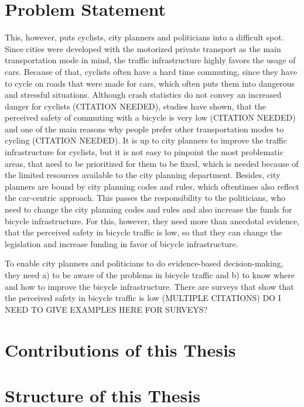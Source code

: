 \section{Problem Statement}
\label{sec:problem}
This, however, puts cyclists, city planners and politicians into a difficult spot.
Since cities were developed with the motorized private transport as the main transportation mode in mind, the traffic infrastructure highly favors the usage of cars.
Because of that, cyclists often have a hard time commuting, since they have to cycle on roads that were made for cars, which often puts them into dangerous and stressful situations.
Although crash statistics do not convey an increased danger for cyclists (CITATION NEEDED), studies have shown, that the perceived safety of commuting with a bicycle is very low (CITATION NEEDED) and one of the main reasons why people prefer other transportation modes to cycling (CITATION NEEDED).
It is up to city planners to improve the traffic infrastructure for cyclists, but it is not easy to pinpoint the most problematic areas, that need to be prioritized for them to be fixed, which is needed because of the limited resources available to the city planning department.
Besides, city planners are bound by city planning codes and rules, which oftentimes also reflect the car-centric approach.
This passes the responsibility to the politicians, who need to change the city planning codes and rules and also increase the funds for bicycle infrastructure.
For this, however, they need more than anecdotal evidence, that the perceived safety in bicycle traffic is low, so that they can change the legislation and increase funding in favor of bicycle infrastructure.

To enable city planners and politicians to do evidence-based decision-making, they need a) to be aware of the problems in bicycle traffic and b) to know where and how to improve the bicycle infrastructure.
There are surveys that show that the perceived safety in bicycle traffic is low (MULTIPLE CITATIONS)
DO I NEED TO GIVE EXAMPLES HERE FOR SURVEYS?

\section{Contributions of this Thesis}
\label{sec:contributions}

\section{Structure of this Thesis}
\label{sec:structure}